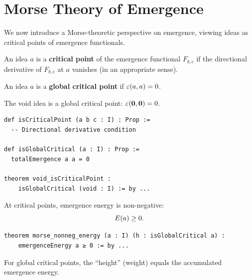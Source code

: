 \section{Morse Theory of Emergence}

We now introduce a Morse-theoretic perspective on emergence, viewing ideas as
critical points of emergence functionals.

\begin{definition}
\label{def:critical-point}
An idea $a$ is a \textbf{critical point} of the emergence functional $F_{b,c}$
if the directional derivative of $F_{b,c}$ at $a$ vanishes (in an appropriate
sense).
\end{definition}

\begin{definition}
\label{def:global-critical}
An idea $a$ is a \textbf{global critical point} if $\varepsilon(a,a) = 0$.
\end{definition}

\begin{theorem}
\label{thm:void-global-critical}
The void idea is a global critical point: $\varepsilon(\mathbf{0}, \mathbf{0}) = 0$.
\end{theorem}

\begin{lstlisting}[caption={Morse theory (IDT\_v3\_Emergence.lean)}]
def isCriticalPoint (a b c : I) : Prop :=
  -- Directional derivative condition

def isGlobalCritical (a : I) : Prop :=
  totalEmergence a a = 0

theorem void_isCriticalPoint :
    isGlobalCritical (void : I) := by ...
\end{lstlisting}

\begin{theorem}
\label{thm:morse-nonneg}
At critical points, emergence energy is non-negative:
\[
  E(a) \geq 0.
\]
\end{theorem}

\begin{lstlisting}[caption={Morse non-negativity (IDT\_v3\_Emergence.lean)}]
theorem morse_nonneg_energy (a : I) (h : isGlobalCritical a) :
    emergenceEnergy a ≥ 0 := by ...
\end{lstlisting}

\begin{theorem}
\label{thm:morse-height}
For global critical points, the ``height'' (weight) equals the accumulated
emergence energy.
\end{theorem}

